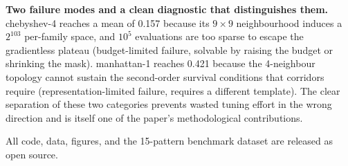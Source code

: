 \noindent\textbf{Two failure modes and a clean diagnostic that distinguishes them.} chebyshev-4 reaches a mean of 0.157 because its $9 \times 9$ neighbourhood induces a $2^{103}$ per-family space, and $10^5$ evaluations are too sparse to escape the gradientless plateau (budget-limited failure, solvable by raising the budget or shrinking the mask). manhattan-1 reaches 0.421 because the 4-neighbour topology cannot sustain the second-order survival conditions that corridors require (representation-limited failure, requires a different template). The clear separation of these two categories prevents wasted tuning effort in the wrong direction and is itself one of the paper's methodological contributions.

\noindent All code, data, figures, and the 15-pattern benchmark dataset are released as open source.
